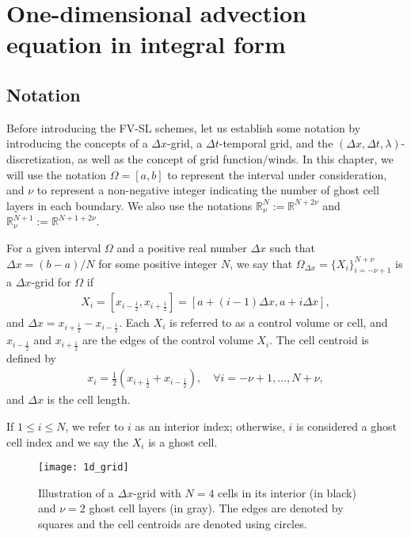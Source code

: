 \section{One-dimensional advection equation in integral form}
\label{chp-adv1d-sec1}

\subsection{Notation}
\label{chp-adv1d-sec-not}
Before introducing the FV-SL schemes, let us establish some notation by introducing
the concepts of a $\Delta x$-grid, a $\Delta t$-temporal grid, and the
$(\Delta x, \Delta t, \lambda)$-discretization, as well as the concept of grid function/winds.
In this chapter, we will use the notation $\Omega=[a,b]$ to represent the interval under consideration,
and $\nu$ to represent a non-negative integer indicating the number of ghost cell layers in each boundary.
We also use the notations $\mathbb{R}^{N}_{\nu}:=\mathbb{R}^{N+2\nu}$ and
$\mathbb{R}^{N+1}_{\nu}:=\mathbb{R}^{N+1+2\nu}$.
\begin{definition}\label{chp-adv1d-def-dxgrid}
	For a given interval $\Omega$ and a positive real number $\Delta x$ such that 
    $\Delta x = (b-a)/N$ for some positive integer $N$, 
	we say that $\Omega_{\Delta x}= \{X_i \}_{i=-\nu+1}^{N+\nu}$ is a $\Delta x$-grid for $\Omega$ if
	\begin{align*}
        X_i = [x_{i-\frac{1}{2}},x_{i+\frac{1}{2}}] = [a+(i-1)\Delta x, a+i\Delta x],
    \end{align*}
	and $\Delta x = x_{i+\frac{1}{2}} - x_{i-\frac{1}{2}}$. 
	Each $X_i$ is referred to as a control volume or cell, and $x_{i-\frac{1}{2}}$ and 
	$x_{i+\frac{1}{2}}$ are the edges of the control volume $X_i$.
	The cell centroid is defined by
    \begin{align*}
    x_i = \frac{1}{2}(x_{i+\frac{1}{2}} + x_{i-\frac{1}{2}}),\quad \forall i = -\nu+1, \ldots, N+\nu,
    \end{align*}
	and $\Delta x$ is the cell length.
\end{definition}
\begin{remark}
If $1 \leq i \leq N$, we refer to $i$ as an interior index;
otherwise, $i$ is considered a ghost cell index and we say the $X_i$ is a ghost cell.
\end{remark}

\begin{figure}[!htb]
	\centering
	\texttt{[image: 1d\_grid]}
	\caption{Illustration of a $\Delta x$-grid with $N=4$ cells in its interior (in black) 
         and $\nu=2$ ghost cell layers (in gray).
	 The edges are denoted by squares and the cell centroids are denoted using circles.\label{chp-adv1d-sec1-grid1d}}
\end{figure}

